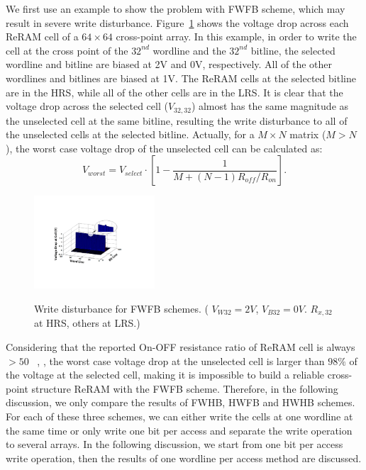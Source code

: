 We first use an example to show the problem with FWFB scheme, which may result in severe write disturbance.
Figure~\ref{fig:FWFR} shows the voltage drop across each ReRAM cell of a $64 \times 64$ cross-point array. In this example, in order to write the cell at the cross point of the $32^{nd}$ wordline and the $32^{nd}$ bitline, the selected wordline and bitline are biased at 2V and 0V, respectively. All of the other wordlines and bitlines are biased at 1V. The ReRAM cells at the selected bitline are in the HRS, while all of the other cells are in the LRS. It is clear that the voltage drop across the selected cell ($V_{32,32}$) almost has the same magnitude as the unselected cell at the same bitline, resulting the write disturbance to all of the unselected cells at the selected bitline. Actually, for a $M \times N$ matrix ($M>N$), the worst case voltage drop of the unselected cell can be calculated as:
\begin{equation}\label{worst_FWFB}
V_{worst}=V_{select} \cdot [1-\frac{1}{M+(N-1)R_{off}/R_{on}}].
\end{equation}

\begin{figure}[!b]
\centering
  \includegraphics[width=0.4\textwidth]{./figures/FWFB4.pdf}\\
  \caption{Write disturbance for FWFB schemes. ( $V_{W32} = 2V$, $V_{B32} = 0V$. $R_{x,32}$ at HRS, others at LRS.) }\label{fig:FWFR}
\end{figure}
Considering that the reported On-OFF resistance ratio of
ReRAM cell is always $>50$ ~\cite{ReRAM_IEDM2010_Ho,ReRAM_IEDM2010_Chien,ReRAM_IEDM2010_Lee_Diode,ReRAM_IEDM2010_Lee_Evidence,ReRAM_ISSCC2011_Sheu,ReRAM_ISSCC2011_Otsuka},
, the worst case voltage drop at the unselected cell is larger than $98\%$ of the voltage at the selected cell, making it is impossible to build a reliable cross-point structure ReRAM with the FWFB scheme. Therefore, in the following discussion, we only compare the results of FWHB, HWFB and HWHB schemes. For each of these three schemes, we can either write the cells at one wordline at the same time or only write one bit per access and separate the write operation to several arrays. In the
following discussion, we start from one bit per access write operation,
then the results of one wordline per access method are discussed.


